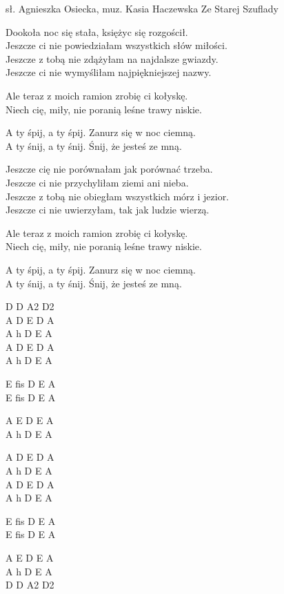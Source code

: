 {sł. Agnieszka Osiecka, muz. Kasia Haczewska}
{Ze Starej Szuflady}
\begin{text}
   \hfill\break
Dookoła noc się stała, księżyc się rozgościł.\\
Jeszcze ci nie powiedziałam wszystkich słów miłości.\\
Jeszcze z tobą nie zdążyłam na najdalsze gwiazdy.\\
Jeszcze ci nie wymyśliłam najpiękniejszej nazwy.

\vin Ale teraz z moich ramion zrobię ci kołyskę.\\
\vin Niech cię, miły, nie poranią leśne trawy niskie.

\vin A ty śpij, a ty śpij. Zanurz się w noc ciemną.\\
\vin A ty śnij, a ty śnij. Śnij, że jesteś ze mną.

Jeszcze cię nie porównałam jak porównać trzeba.\\
Jeszcze ci nie przychyliłam ziemi ani nieba.\\
Jeszcze z tobą nie obiegłam wszystkich mórz i jezior.\\
Jeszcze ci nie uwierzyłam, tak jak ludzie wierzą.

\vin Ale teraz z moich ramion zrobię ci kołyskę.\\
\vin Niech cię, miły, nie poranią leśne trawy niskie.

\vin A ty śpij, a ty śpij. Zanurz się w noc ciemną.\\
\vin A ty śnij, a ty śnij. Śnij, że jesteś ze mną.
\end{text}
\begin{chord}
D D A2 D2\\
A D E D A\\
A h D E A\\
A D E D A\\
A h D E A

E fis D E A\\
E fis D E A

A E D E A \\
A h D E A

A D E D A\\
A h D E A\\
A D E D A\\
A h D E A

E fis D E A\\
E fis D E A

A E D E A \\
A h D E A \\
D D A2 D2
\end{chord}

